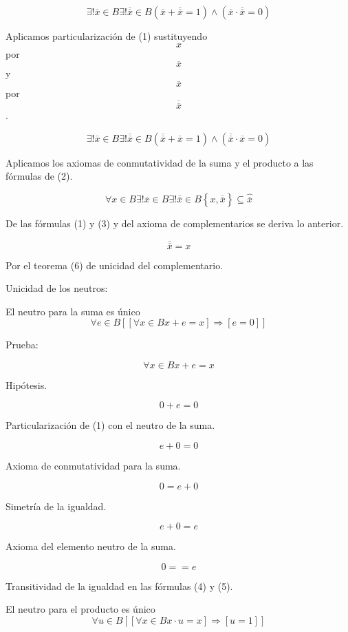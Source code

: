 \[{}{}{\exists\mathtt{\mathrm{!}}}{\overline{x} \in B}{}{}{}{\exists\mathtt{\mathrm{!}}}{\overline{\overline{x}} \in B}{}{}{}{\left( {{\overline{x} + \overline{\overline{x}}} = 1} \right) \land \left( {{\overline{x} \cdot \overline{\overline{x}}} = 0} \right)}\]

Aplicamos particularización de (1) sustituyendo \[x\] por
\[\overline{x}\]y \[\overline{x}\] por \[\overline{\overline{x}}\].

\[{}{}{\exists\mathtt{\mathrm{!}}}{\overline{x} \in B}{}{}{}{\exists\mathtt{\mathrm{!}}}{\overline{\overline{x}} \in B}{}{}{}{\left( {{\overline{\overline{x}} + \overline{x}} = 1} \right) \land \left( {{\overline{\overline{x}} \cdot \overline{x}} = 0} \right)}\]

Aplicamos los axiomas de conmutatividad de la suma y el producto a las
fórmulas de (2).

\[\forall{x \in B}\exists!{\overline{x} \in B}\exists!{\overline{\overline{x}} \in B}{\left\{ {x,\overline{\overline{x}}} \right\} \subseteq \widehat{\overline{x}}}\]

De las fórmulas (1) y (3) y del axioma de complementarios se deriva lo
anterior.

\[\overline{\overline{x}} = x\]

Por el teorema (6) de unicidad del complementario.

Unicidad de los neutros:

El neutro para la suma es único
\[\forall{e \in B}\left\lbrack {\left\lbrack {\forall{x \in B}{{x + e} = x}} \right\rbrack\Rightarrow\left\lbrack {e = 0} \right\rbrack} \right\rbrack\]

Prueba:

\[\forall{x \in B}{{x + e} = x}\]

Hipótesis.

\[{0 + e} = 0\]

Particularización de (1) con el neutro de la suma.

\[{e + 0} = 0\]

Axioma de conmutatividad para la suma.

\[0 = {e + 0}\]

Simetría de la igualdad.

\[{e + 0} = e\]

Axioma del elemento neutro de la suma.

\[{0 =} = e\]

Transitividad de la igualdad en las fórmulas (4) y (5).

El neutro para el producto es único
\[\forall{u \in B}\left\lbrack {\left\lbrack {\forall{x \in B}{{x \cdot u} = x}} \right\rbrack\Rightarrow\left\lbrack {u = 1} \right\rbrack} \right\rbrack\]

